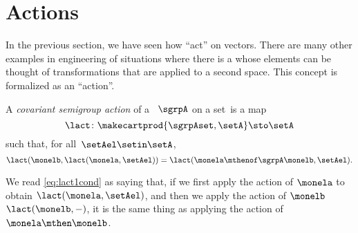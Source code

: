 
\section{Actions}
\label{sec:actions}
In the previous section, we have seen how  ``act'' on vectors.
There are many other examples in engineering of situations where there is a   whose elements can be thought of transformations that are applied to a second space.
This concept is formalized as an ``action''.

\begin{ctdefinition}
    \label{def:semigroup-cov-action-prelim}
    A \emph{covariant semigroup action} of a ~$\sgrpA$ on a set~\setA is a map
    \begin{equation}
        \label{eq:lact}
        \lact \colon \makecartprod{\sgrpAset, \setA} \sto \setA
    \end{equation}
    such that, for all~$\setAel \setin \setA$,
    \begin{equation}
        \label{eq:lact1cond}
        \lact(\monelb, \lact(\monela, \setAel)) = \lact(\monela \mthenof\sgrpA \monelb, \setAel).
    \end{equation}
\end{ctdefinition}

We read \cref{eq:lact1cond} as saying that, if we first apply the action of $\monela$ to obtain $\lact(\monela, \setAel)$,
and then we apply the action of $\monelb$ $\lact(\monelb, -)$, it is the same thing as applying the action of $\monela\mthen\monelb$.


